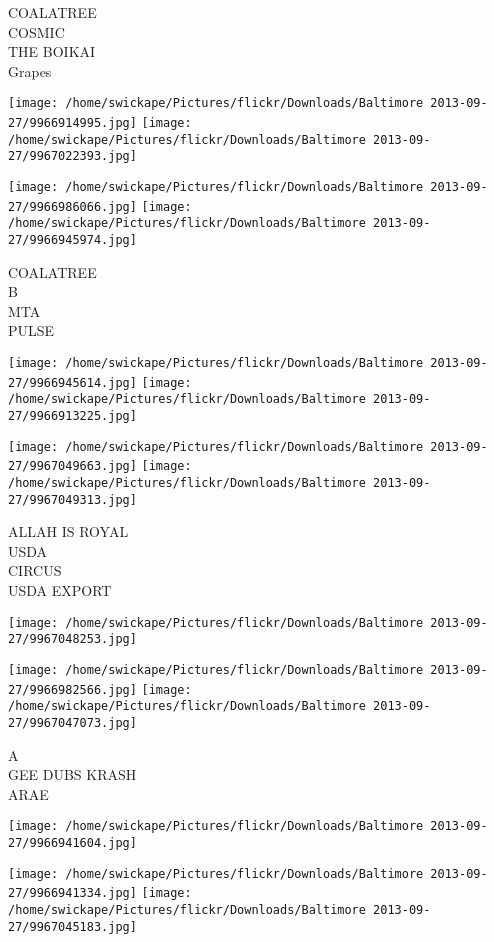 \documentclass[10pt,letterpaper]{article}
\begin{document}
COALATREE\\
COSMIC\\
THE BOIKAI\\
Grapes
\pagebreak

\texttt{[image: /home/swickape/Pictures/flickr/Downloads/Baltimore 2013-09-27/9966914995.jpg]}
\texttt{[image: /home/swickape/Pictures/flickr/Downloads/Baltimore 2013-09-27/9967022393.jpg]}

\texttt{[image: /home/swickape/Pictures/flickr/Downloads/Baltimore 2013-09-27/9966986066.jpg]}
\texttt{[image: /home/swickape/Pictures/flickr/Downloads/Baltimore 2013-09-27/9966945974.jpg]}

COALATREE\\
B\\
MTA\\
PULSE
\pagebreak

\texttt{[image: /home/swickape/Pictures/flickr/Downloads/Baltimore 2013-09-27/9966945614.jpg]}
\texttt{[image: /home/swickape/Pictures/flickr/Downloads/Baltimore 2013-09-27/9966913225.jpg]}

\texttt{[image: /home/swickape/Pictures/flickr/Downloads/Baltimore 2013-09-27/9967049663.jpg]}
\texttt{[image: /home/swickape/Pictures/flickr/Downloads/Baltimore 2013-09-27/9967049313.jpg]}

ALLAH IS ROYAL\\
USDA\\
CIRCUS\\
USDA EXPORT
\pagebreak

\texttt{[image: /home/swickape/Pictures/flickr/Downloads/Baltimore 2013-09-27/9967048253.jpg]}

\vspace{0.25in}
\texttt{[image: /home/swickape/Pictures/flickr/Downloads/Baltimore 2013-09-27/9966982566.jpg]}
\texttt{[image: /home/swickape/Pictures/flickr/Downloads/Baltimore 2013-09-27/9967047073.jpg]}

A\\
GEE DUBS KRASH\\
ARAE
\pagebreak

\texttt{[image: /home/swickape/Pictures/flickr/Downloads/Baltimore 2013-09-27/9966941604.jpg]}

\vspace{0.25in}
\texttt{[image: /home/swickape/Pictures/flickr/Downloads/Baltimore 2013-09-27/9966941334.jpg]}
\texttt{[image: /home/swickape/Pictures/flickr/Downloads/Baltimore 2013-09-27/9967045183.jpg]}
\end{document}
